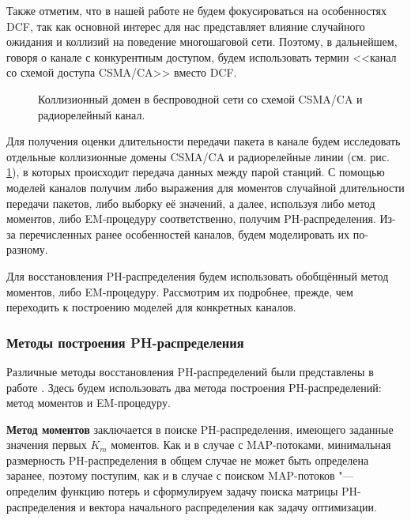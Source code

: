 Также отметим, что в нашей работе не будем фокусироваться на особенностях DCF, так как основной интерес для нас представляет влияние случайного ожидания и коллизий на поведение многошаговой сети. Поэтому, в дальнейшем, говоря о канале с конкурентным доступом, будем использовать термин <<канал со схемой доступа CSMA/CA>> вместо DCF.

\begin{figure}[h]
  \caption{Коллизионный домен в беспроводной сети со схемой CSMA/CA и радиорелейный канал.}
  \label{fig:ch4_collision_domains}
\end{figure}

Для получения оценки длительности передачи пакета в канале будем исследовать отдельные коллизионные домены CSMA/CA и радиорелейные линии (см. рис. \ref{fig:ch4_collision_domains}), в которых происходит передача данных между парой станций. С помощью моделей каналов получим либо выражения для моментов случайной длительности передачи пакетов, либо выборку её значений, а далее, используя либо метод моментов, либо EM-процедуру соответственно, получим PH-распределения. Из-за перечисленных ранее особенностей каналов, будем моделировать их по-разному. 

Для восстановления PH-распределения будем использовать обобщённый метод моментов, либо EM-процедуру. Рассмотрим их подробнее, прежде, чем переходить к построению моделей для конкретных каналов.



\subsubsection{Методы построения PH-распределения}

Различные методы восстановления PH-распределений были представлены в работе \cite{QS_ITMM2017}. Здесь будем использовать два метода построения PH-распределений: метод моментов и EM-процедуру.

\textbf{Метод моментов} заключается в поиске PH-распределения, имеющего заданные значения первых $K_m$ моментов. Как и в случае с MAP-потоками, минимальная размерность PH-распределения в общем случае не может быть определена заранее, поэтому поступим, как и в случае с поиском MAP-потоков  "--- определим функцию потерь и сформулируем задачу поиска матрицы PH-распределения и вектора начального распределения как задачу оптимизации.

